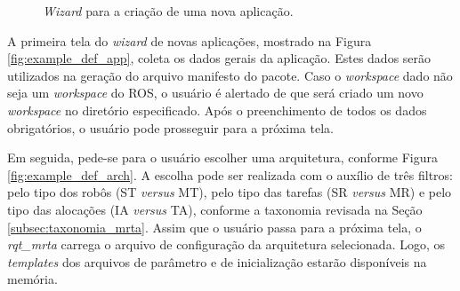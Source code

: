 \begin{figure}[htb]
            \caption{\textit{Wizard} para a criação de uma nova aplicação.} \label{fig:example_new_app}
        \end{figure}
        
        A primeira tela do \textit{wizard} de novas aplicações, mostrado na Figura \ref{fig:example_def_app}, coleta os dados gerais da aplicação. Estes dados serão utilizados na geração do arquivo manifesto do pacote. Caso o \textit{workspace} dado não seja um \textit{workspace} do ROS, o usuário é alertado de que será criado um novo \textit{workspace} no diretório especificado. Após o preenchimento de todos os dados obrigatórios, o usuário pode prosseguir para a próxima tela.
        
        Em seguida, pede-se para o usuário escolher uma arquitetura, conforme Figura \ref{fig:example_def_arch}. A escolha pode ser realizada com o auxílio de três filtros: pelo tipo dos robôs (ST \textit{versus} MT), pelo tipo das tarefas (SR \textit{versus} MR) e pelo tipo das alocações (IA \textit{versus} TA), conforme a taxonomia revisada na Seção \ref{subsec:taxonomia_mrta}. Assim que o usuário passa para a próxima tela, o \textit{rqt\_mrta} carrega o arquivo de configuração da arquitetura selecionada. Logo, os \textit{templates} dos arquivos de parâmetro e de inicialização estarão disponíveis na memória.
        
